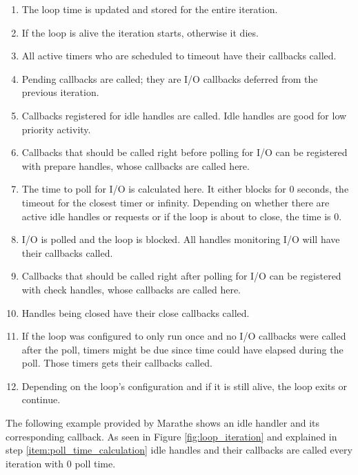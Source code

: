\begin{enumerate}
  \item The loop time is updated and stored for the entire iteration.
  \item If the loop is alive the iteration starts, otherwise it dies.
  \item All active timers who are scheduled to timeout have their callbacks
    called.
  \item Pending callbacks are called; they are I/O callbacks deferred from the previous
    iteration.
  \item Callbacks registered for idle handles are called. Idle handles are good
    for low priority activity.
  \item Callbacks that should be called right before polling for I/O can be
    registered with prepare handles, whose callbacks are called here.
  \item The time to poll for I/O is calculated here. It either blocks for 0
    seconds, the timeout for the closest timer or infinity. Depending on
    whether there are active idle handles or requests or if the loop is about
    to close, the time is 0. \label{item:poll_time_calculation}
  \item I/O is polled and the loop is blocked. All handles monitoring I/O will
    have their callbacks called.
  \item Callbacks that should be called right after polling for I/O can be
    registered with check handles, whose callbacks are called here.
  \item Handles being closed have their close callbacks called.
  \item If the loop was configured to only run once and no I/O callbacks were
    called after the poll, timers might be due since time could have elapsed
    during the poll. Those timers gets their callbacks called.
  \item Depending on the loop's configuration and if it is still alive, the
    loop exits or continue.
\end{enumerate}

The following example provided by Marathe \cite{uvbook} shows an idle handler
and its corresponding callback. As seen in Figure \ref{fig:loop_iteration} and
explained in step \ref{item:poll_time_calculation} idle handles and their
callbacks are called every iteration with 0 poll time.



